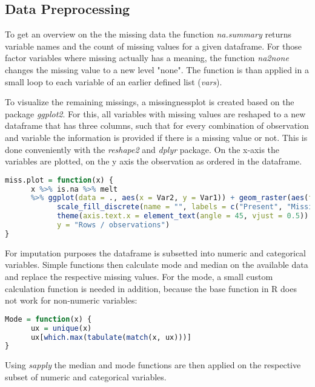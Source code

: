 \subsection{Data Preprocessing}

To  get an overview on the  the missing data the  function \textit{na.summary} returns variable names and the count of missing values for a given dataframe. 
For those factor variables where missing actually has a meaning, the function \textit{na2none} changes the missing value to a new level  "none". The function is than applied in a small loop to each variable of an earlier defined list (\textit{vars}). 

To visualize the remaining missings, a  missingnessplot  is created based on the package \textit{ggplot2}. For this, all variables with missing values are reshaped to a new dataframe that has three columns, such that for every combination of observation and variable the information is provided if there is a missing value or not. This is done conveniently with the \textit{reshape2} and \textit{dplyr} package.  
On the x-axis the variables are plotted, on the y axis the observation as ordered in the dataframe.

\begin{lstlisting}[language=R]
miss.plot = function(x) {
      x %>% is.na %>% melt 
      %>% ggplot(data = ., aes(x = Var2, y = Var1)) + geom_raster(aes(fill = value)) + 
            scale_fill_discrete(name = "", labels = c("Present", "Missing")) + theme_classic() + 
            theme(axis.text.x = element_text(angle = 45, vjust = 0.5)) + labs(x = "Variables in Dataset", 
            y = "Rows / observations")
}
\end{lstlisting}

For imputation purposes the dataframe is subsetted into numeric and categorical variables. 
Simple functions then calculate mode and median on the available data and replace the respective missing values.
For the mode, a small custom calculation function is needed in addition, because the base function in R does not work for non-numeric variables: 
\begin{lstlisting}[language=R]
Mode = function(x) {
      ux = unique(x)
      ux[which.max(tabulate(match(x, ux)))]
}
\end{lstlisting}
Using \textit{sapply} the median and mode functions are then applied on the respective subset of numeric and categorical variables. 

